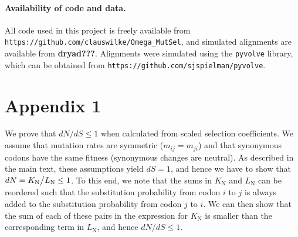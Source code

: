 \documentclass{pnastwo}
\begin{document}
\begin{article}
\paragraph{Availability of code and data.}
All code used in this project is freely available from \\ \texttt{https://github.com/clauswilke/Omega\_MutSel}, and simulated alignments are available from \textbf{dryad???}. Alignments were simulated using the \texttt{pyvolve} library, which can be obtained from \texttt{https://github.com/sjspielman/pyvolve}.



\section*{Appendix 1}
We prove that $dN/dS \leq 1$ when calculated from scaled selection coefficients. We assume that mutation rates are symmetric ($m_{ij} = m_{ji}$) and that synonymous codons have the same fitness (synonymous changes are neutral). As described in the main text, these assumptions yield $dS = 1$, and hence we have to show that $dN = K_\text{N}\big{/}L_\text{N} \leq 1$. To this end, we note that the sums in $K_\text{N}$ and $L_\text{N}$ can be reordered such that the substitution probability from codon $i$ to $j$ is always added to the substitution probability from codon $j$ to $i$. We can then show that the sum of each of these pairs in the expression for $K_\text{N}$ is smaller than the corresponding term in $L_\text{N}$, and hence $dN/dS \leq 1$.


\end{article}
\end{document}

